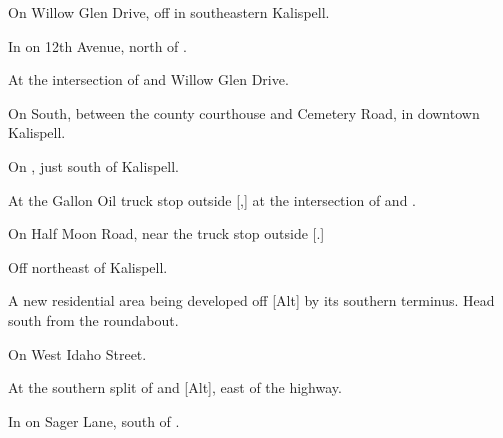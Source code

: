 

\begin{LocationList}

On Willow Glen Drive, off  in southeastern Kalispell.

In  on 12th Avenue, north of .

At the intersection of  and Willow Glen Drive.

On  South, between the county courthouse and Cemetery Road, in downtown Kalispell.

On , just south of Kalispell.

At the Gallon Oil truck stop outside [,] at the intersection of  and .

\Location{\GarageHQ \Garage}
On Half Moon Road, near the truck stop outside [.]

Off 
northeast of Kalispell.

A new residential area being developed off [Alt] by its southern terminus. Head south from the roundabout.

\Location{\RecruitmentAgency \Recruitment}
On  West Idaho Street.

At the southern split of  and [Alt], east of the highway.

In  on Sager Lane, south of .

\end{LocationList}

